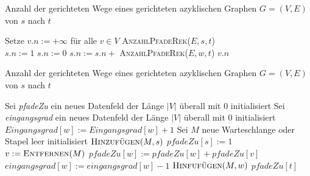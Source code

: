
\begin{solution}

\phantom{}

\begin{algorithm}
    \caption{Anzahl der gerichteten Wege eines gerichteten azyklischen Graphen $G = (V, E)$ von $s$ nach $t$}
    \begin{algorithmic}[1]
        \State Setze $v.n := +\infty$ für alle $v \in V$
        \State \Return \textsc{AnzahlPfadeRek}($E,s,t$)
        \EndProcedure
    \\
                    \State $s.n := 1$
                \Else
                    \State $s.n := 0$
                        \State $s.n := s.n +$ \textsc{AnzahlPfadeRek}($E,w,t$)
                    \EndFor
                \EndIf
            \EndIf
            \State \Return $v.n$
        \EndProcedure
    \end{algorithmic}
\end{algorithm}

\end{solution}

\begin{solution}

\phantom{}
	\begin{algorithm}
		\caption{Anzahl der gerichteten Wege eines gerichteten azyklischen Graphen $G = (V, E)$ von $s$ nach $t$}
		\begin{algorithmic}[1]
			\State Sei \textit{pfadeZu} ein neues Datenfeld der Länge $|V|$ überall mit $0$ initialisiert
			\State Sei \textit{eingangsgrad} ein neues Datenfeld der Länge $|V|$ überall mit $0$ initialisiert
				\State $\textit{Eingangsgrad}[w] := \textit{Eingangsgrad}[w] + 1$
			\EndFor
			\State Sei $M$ neue Warteschlange oder Stapel leer initialisiert
			\State $\textsc{Hinzufügen}(M,s)$
			\State $\textit{pfadeZu}[s] := 1$
				\State $v := \textsc{Entfernen}(M)$
					\State $\textit{pfadeZu}[w] := \textit{pfadeZu}[w] + \textit{pfadeZu}[v]$
					\State $\textit{eingangsgrad}[w] := \textit{eingangsgrad}[w] - 1$
						\State $\textsc{Hinfufügen}(M,w)$
					\EndIf
				\EndFor
			\EndWhile
			\State \Return $\textit{pfadeZu}[t]$
			\EndProcedure
		\end{algorithmic}
	\end{algorithm}
\end{solution}

\FloatBarrier
